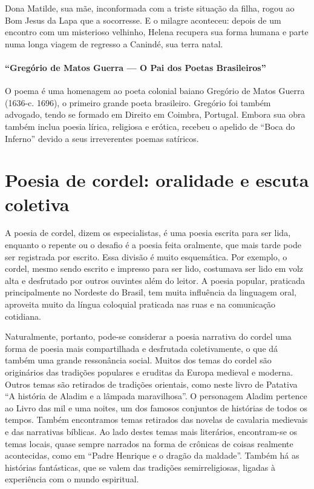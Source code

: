 Dona Matilde, sua mãe, inconformada com a triste situação da filha,
rogou ao Bom Jesus da Lapa que a socorresse. E o milagre aconteceu:
depois de um encontro com um misterioso velhinho, Helena recupera sua
forma humana e parte numa longa viagem de regresso a Canindé, sua terra
natal. 

\paragraph{“Gregório de Matos Guerra — O Pai dos Poetas Brasileiros”}

O poema é uma homenagem ao poeta colonial baiano Gregório de Matos
Guerra (1636-c. 1696), o primeiro grande poeta brasileiro. Gregório foi
também advogado, tendo se formado em Direito em Coimbra, Portugal.
Embora sua obra também inclua poesia lírica, religiosa e erótica,
recebeu o apelido de “Boca do Inferno” devido a seus irreverentes
poemas satíricos.

\section{Poesia de cordel: oralidade e escuta coletiva} 

A poesia de cordel, dizem os especialistas, é uma poesia escrita para ser lida,
enquanto o repente ou o desafio é a poesia feita oralmente, que mais tarde pode
ser registrada por escrito. Essa divisão é muito esquemática. Por exemplo, o
cordel, mesmo sendo escrito e impresso para ser lido, costumava ser lido em
volz alta e desfrutado por outros ouvintes além do leitor. A poesia popular,
praticada principalmente no Nordeste do Brasil, tem muita influência da
linguagem oral, aproveita muito da língua coloquial praticada nas ruas e na
comunicação cotidiana. 

Naturalmente, portanto, pode-se considerar a poesia narrativa do cordel uma
forma de poesia mais compartilhada e desfrutada coletivamente, o que dá também
uma grande ressonância social. Muitos dos temas do cordel são originários das
tradições populares e eruditas da Europa medieval e moderna. Outros temas são
retirados de tradições orientais, como neste livro de Patativa “A história de
Aladim e a lâmpada maravilhosa”. O personagem Aladim pertence ao Livro das mil
e uma noites, um dos famosos conjuntos de histórias de todos os tempos. Também
encontramos temas retirados das novelas de cavalaria medievais e das narrativas
bíblicas. Ao lado destes temas mais literários, encontram-se os temas locais,
quase sempre narrados na forma de crônicas de coisas realmente acontecidas,
como em “Padre Henrique e o dragão da maldade”. Também há as histórias
fantásticas, que se valem das tradições semirreligiosas, ligadas à experiência
com o mundo espiritual. 

